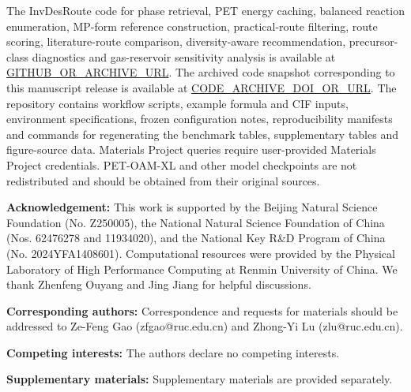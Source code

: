 \documentclass[11pt, letterpaper]{article}
\newcommand{\invdesroute}{InvDesRoute}
\begin{document}
The \invdesroute{} code for phase retrieval, PET energy caching, balanced reaction enumeration, MP-form reference construction, practical-route filtering, route scoring, literature-route comparison, diversity-aware recommendation, precursor-class diagnostics and gas-reservoir sensitivity analysis is available at \url{GITHUB_OR_ARCHIVE_URL}. The archived code snapshot corresponding to this manuscript release is available at \url{CODE_ARCHIVE_DOI_OR_URL}. The repository contains workflow scripts, example formula and CIF inputs, environment specifications, frozen configuration notes, reproducibility manifests and commands for regenerating the benchmark tables, supplementary tables and figure-source data. Materials Project queries require user-provided Materials Project credentials. PET-OAM-XL and other model checkpoints are not redistributed and should be obtained from their original sources.




\vspace{6pt}
\noindent\textbf{Acknowledgement:} This work is supported by the Beijing Natural Science Foundation (No. Z250005), the National Natural Science Foundation of China (Nos. 62476278 and 11934020), and the National Key R\&D Program of China (No. 2024YFA1408601). Computational resources were provided by the Physical Laboratory of High Performance Computing at Renmin University of China. We thank Zhenfeng Ouyang and Jing Jiang for helpful discussions.

\noindent\textbf{Corresponding authors:} Correspondence and requests for materials should be addressed to Ze-Feng Gao (zfgao@ruc.edu.cn) and Zhong-Yi Lu (zlu@ruc.edu.cn).

\noindent\textbf{Competing interests:} The authors declare no competing interests. 

\noindent\textbf{Supplementary materials:} Supplementary materials are provided separately.

\clearpage





\end{document}
